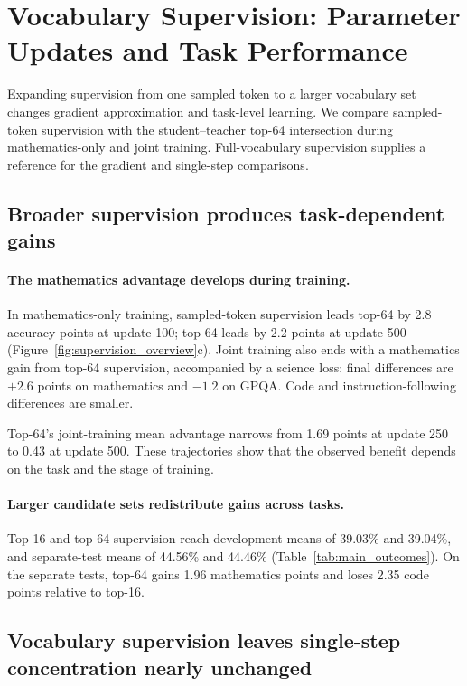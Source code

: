 \section{Vocabulary Supervision: Parameter Updates and Task Performance}
\label{sec:density}

Expanding supervision from one sampled token to a larger vocabulary set changes gradient approximation and task-level learning. We compare sampled-token supervision with the student--teacher top-64 intersection during mathematics-only and joint training. Full-vocabulary supervision supplies a reference for the gradient and single-step comparisons.

\subsection{Broader supervision produces task-dependent gains}

\paragraph{The mathematics advantage develops during training.}
In mathematics-only training, sampled-token supervision leads top-64 by 2.8 accuracy points at update 100; top-64 leads by 2.2 points at update 500 (Figure~\ref{fig:supervision_overview}c). Joint training also ends with a mathematics gain from top-64 supervision, accompanied by a science loss: final differences are $+2.6$ points on mathematics and $-1.2$ on GPQA. Code and instruction-following differences are smaller.

Top-64's joint-training mean advantage narrows from 1.69 points at update 250 to 0.43 at update 500. These trajectories show that the observed benefit depends on the task and the stage of training.

\paragraph{Larger candidate sets redistribute gains across tasks.}
Top-16 and top-64 supervision reach development means of 39.03\% and 39.04\%, and separate-test means of 44.56\% and 44.46\% (Table~\ref{tab:main_outcomes}). On the separate tests, top-64 gains 1.96 mathematics points and loses 2.35 code points relative to top-16.





\subsection{Vocabulary supervision leaves single-step concentration nearly unchanged}

